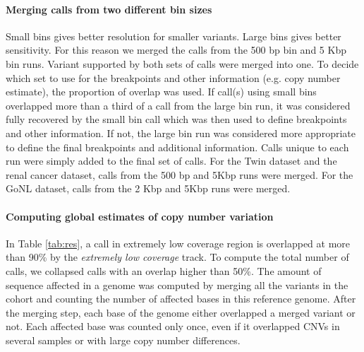 \paragraph{Merging calls from two different bin sizes}
Small bins gives better resolution for smaller variants.
Large bins gives better sensitivity.
For this reason we merged the calls from the 500 bp bin and 5 Kbp bin runs.
Variant supported by both sets of calls were merged into one.
To decide which set to use for the breakpoints and other information (e.g. copy number estimate), the proportion of overlap was used.
If call(s) using small bins overlapped more than a third of a call from the large bin run, it was considered fully recovered by the small bin call which was then used to define breakpoints and other information.
If not, the large bin run was considered more appropriate to define the final breakpoints and additional information.
Calls unique to each run were simply added to the final set of calls.
For the Twin dataset and the renal cancer dataset, calls from the 500 bp and 5Kbp runs were merged.
For the GoNL dataset, calls from the 2 Kbp and 5Kbp runs were merged.

\paragraph{Computing global estimates of copy number variation}
In Table \ref{tab:res}, a call in extremely low coverage region is overlapped at more than 90\% by the {\it extremely low coverage} track.
To compute the total number of calls, we collapsed calls with an overlap higher than 50\%.
The amount of sequence affected in a genome was computed by merging all the variants in the cohort and counting the number of affected bases in this reference genome.
After the merging step, each base of the genome either overlapped a merged variant or not.
Each affected base was counted only once, even if it overlapped CNVs in several samples or with large copy number differences.

